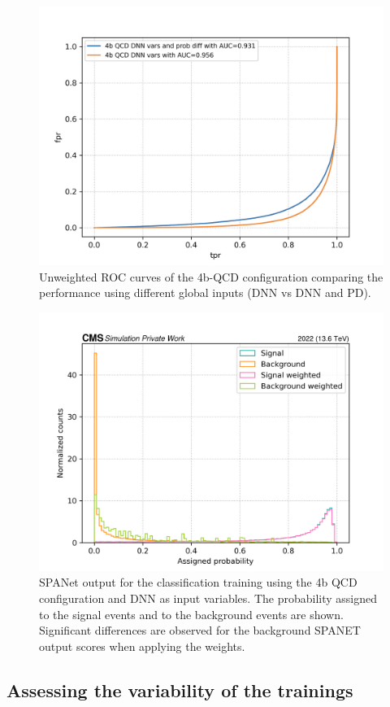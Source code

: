 \begin{figure}[hbt]
    \centering
    \includegraphics[width=0.7\linewidth]{Images/7.S_B/Inputs/no weights 4b QCD.png}
    \caption{Unweighted ROC curves of the 4b-QCD configuration comparing the performance using different global inputs (DNN vs DNN and PD).}
    \label{fig: 4b QCD ROC no weights}
\end{figure}

\begin{figure}
    \centering
    \includegraphics[width=0.7\linewidth]{Images/7.S:B/Classification outputs/4b QCD dnn.png}
    \caption{SPANet output for the classification training using the 4b QCD configuration and DNN as input variables. The probability assigned to the signal events and to the background events are shown. Significant differences are observed for the background SPANET output scores when applying the weights.}
    \label{fig: SPANet output S/B 4b QCD}
\end{figure}

\clearpage

\subsection{Assessing the variability of the trainings} \label{subsection: var of training S/B}

